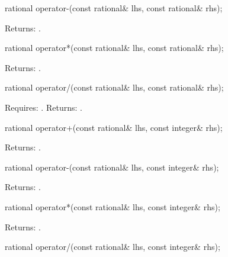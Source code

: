 \begin{itemdecl}
rational operator-(const rational& lhs, const rational& rhs);
\end{itemdecl}

\begin{itemdescr}
Returns: .
\end{itemdescr}

\begin{itemdecl}
rational operator*(const rational& lhs, const rational& rhs);
\end{itemdecl}

\begin{itemdescr}
Returns: .
\end{itemdescr}

\begin{itemdecl}
rational operator/(const rational& lhs, const rational& rhs);
\end{itemdecl}

\begin{itemdescr}
Requires: .
Returns: .
\end{itemdescr}

\begin{itemdecl}
rational operator+(const rational& lhs, const integer& rhs);
\end{itemdecl}

\begin{itemdescr}
Returns: .
\end{itemdescr}

\begin{itemdecl}
rational operator-(const rational& lhs, const integer& rhs);
\end{itemdecl}

\begin{itemdescr}
Returns: .
\end{itemdescr}

\begin{itemdecl}
rational operator*(const rational& lhs, const integer& rhs);
\end{itemdecl}

\begin{itemdescr}
Returns: .
\end{itemdescr}

\begin{itemdecl}
rational operator/(const rational& lhs, const integer& rhs);
\end{itemdecl}


